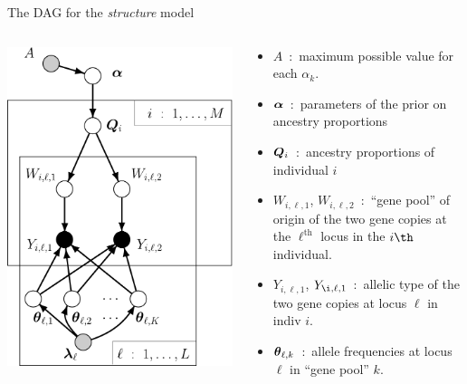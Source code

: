 \documentclass[letter,graphicx]{beamer}
\newcommand{\thh}{^\mathrm{th}}
\def\bm#1{\mathpalette\bmstyle{#1}}
\def\bmstyle#1#2{\mbox{\boldmath$#1#2$}}
\begin{document}
\begin{frame}{The DAG for the {\em structure} model}
\begin{columns}
    \begin{column}{0.41\textwidth}
        \includegraphics[width=1.0\textwidth]{../diagrams/PritchSimple.pdf}
    \end{column}
    \begin{column}{0.59\textwidth}
    	\begin{itemize}
		\item $A$~:~maximum possible value for each $\alpha_k$.
		\item $\bm{\alpha}$~:~parameters of the prior on ancestry proportions
		\item $\bm{Q}_i$~:~ancestry proportions of individual $i$
		\item $W_{i,\ell,1}$, $W_{i,\ell,2}$~:~``gene pool'' of origin of the two 
		gene copies at the $\ell\thh$ locus in the $i\th$ individual. 
		\item $Y_{i,\ell,1}$, $Y_{\i,\ell,1}$~:~allelic type of the two gene
		copies at locus $\ell$ in indiv $i$.
		\item $\bm{\theta}_{\ell,k}$~:~allele frequencies at locus $\ell$ in ``gene pool'' $k$.
        \end{itemize}
    \end{column}
\end{columns}
\end{frame}
\end{document}
